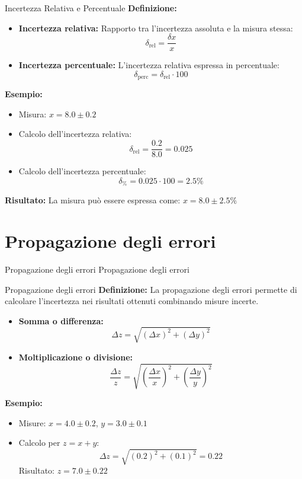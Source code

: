 \documentclass[9pt]{beamer}
\begin{document}
\begin{frame}{Incertezza Relativa e Percentuale}
\textbf{Definizione:}
\begin{itemize}
    \item \textbf{Incertezza relativa:} Rapporto tra l’incertezza assoluta e la misura stessa:
    $$
    \delta_{\text{rel}} = \frac{\delta x}{x}
    $$
    \item \textbf{Incertezza percentuale:} L’incertezza relativa espressa in percentuale:
    $$
    \delta_{\text{perc}} = \delta_{\text{rel}} \cdot 100
    $$
\end{itemize}

\textbf{Esempio:}
\begin{itemize}
    \item Misura: $ x = 8.0 \pm 0.2 $
    \item Calcolo dell’incertezza relativa:
    $$
    \delta_{\text{rel}} = \frac{0.2}{8.0} = 0.025
    $$
    \item Calcolo dell’incertezza percentuale:
    $$
    \delta_{\%} = 0.025 \cdot 100 = 2.5\%
    $$
\end{itemize}

\textbf{Risultato:} La misura può essere espressa come:
$
x = 8.0 \pm 2.5\%
$
\end{frame}

\section{Propagazione degli errori}
\begin{frame}{Propagazione degli errori}
\centering
\Huge Propagazione degli errori
\end{frame}


\begin{frame}{Propagazione degli errori}
\textbf{Definizione:} La propagazione degli errori permette di calcolare l’incertezza nei risultati ottenuti combinando misure incerte.
\begin{itemize}
    \item \textbf{Somma o differenza:}
    $$
    \Delta z = \sqrt{(\Delta x)^2 + (\Delta y)^2}
    $$
    \item \textbf{Moltiplicazione o divisione:}
    $$
    \frac{\Delta z}{z} = \sqrt{\left(\frac{\Delta x}{x}\right)^2 + \left(\frac{\Delta y}{y}\right)^2}
    $$
\end{itemize}
\textbf{Esempio:}
\begin{itemize}
    \item Misure: $ x = 4.0 \pm 0.2 $, $ y = 3.0 \pm 0.1 $
    \item Calcolo per $ z = x + y $:
    $$
    \Delta z = \sqrt{(0.2)^2 + (0.1)^2} = 0.22
    $$
    Risultato: $ z = 7.0 \pm 0.22 $
\end{itemize}
\end{frame}
\end{document}
